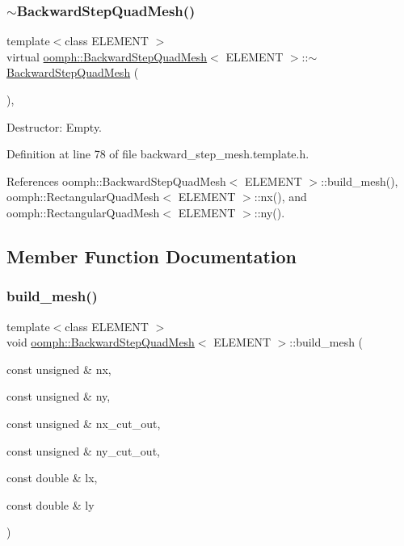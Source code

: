 \subsubsection{\texorpdfstring{$\sim$\+Backward\+Step\+Quad\+Mesh()}{~BackwardStepQuadMesh()}}
{\footnotesize\ttfamily template$<$class E\+L\+E\+M\+E\+NT $>$ \\
virtual \hyperlink{classoomph_1_1BackwardStepQuadMesh}{oomph\+::\+Backward\+Step\+Quad\+Mesh}$<$ E\+L\+E\+M\+E\+NT $>$\+::$\sim$\hyperlink{classoomph_1_1BackwardStepQuadMesh}{Backward\+Step\+Quad\+Mesh} (\begin{DoxyParamCaption}{ }\end{DoxyParamCaption})\hspace{0.3cm}{\ttfamily [inline]}, {\ttfamily [virtual]}}



Destructor\+: Empty. 



Definition at line 78 of file backward\+\_\+step\+\_\+mesh.\+template.\+h.



References oomph\+::\+Backward\+Step\+Quad\+Mesh$<$ E\+L\+E\+M\+E\+N\+T $>$\+::build\+\_\+mesh(), oomph\+::\+Rectangular\+Quad\+Mesh$<$ E\+L\+E\+M\+E\+N\+T $>$\+::nx(), and oomph\+::\+Rectangular\+Quad\+Mesh$<$ E\+L\+E\+M\+E\+N\+T $>$\+::ny().



\subsection{Member Function Documentation}
\mbox{\label{classoomph_1_1BackwardStepQuadMesh_ab71a6f2854d36b845ed79dccb0101991}} 
\subsubsection{\texorpdfstring{build\+\_\+mesh()}{build\_mesh()}}
{\footnotesize\ttfamily template$<$class E\+L\+E\+M\+E\+NT $>$ \\
void \hyperlink{classoomph_1_1BackwardStepQuadMesh}{oomph\+::\+Backward\+Step\+Quad\+Mesh}$<$ E\+L\+E\+M\+E\+NT $>$\+::build\+\_\+mesh (\begin{DoxyParamCaption}\item[{const unsigned \&}]{nx,  }\item[{const unsigned \&}]{ny,  }\item[{const unsigned \&}]{nx\+\_\+cut\+\_\+out,  }\item[{const unsigned \&}]{ny\+\_\+cut\+\_\+out,  }\item[{const double \&}]{lx,  }\item[{const double \&}]{ly }\end{DoxyParamCaption})\hspace{0.3cm}{\ttfamily [private]}}



